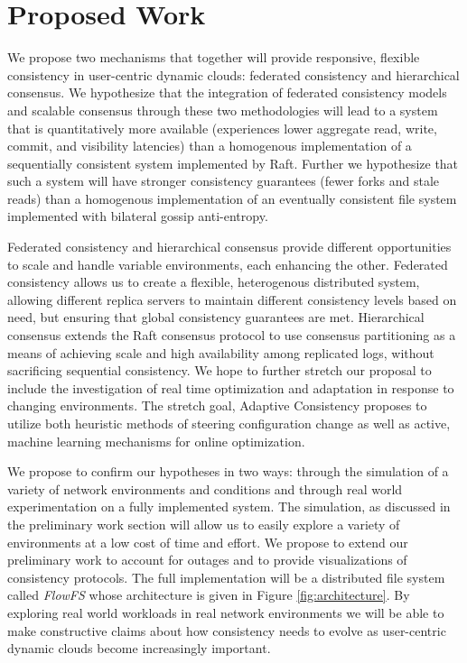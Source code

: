 \documentclass{article}
\begin{document}
\section{Proposed Work}
\label{sec:proposed_work}

We propose two mechanisms that together will provide responsive, flexible consistency in user-centric dynamic clouds: federated consistency and hierarchical consensus. We hypothesize that the integration of federated consistency models and scalable consensus through these two methodologies will lead to a system that is quantitatively more available (experiences lower aggregate read, write, commit, and visibility latencies) than a homogenous implementation of a sequentially consistent system implemented by Raft. Further we hypothesize that such a system will have stronger consistency guarantees (fewer forks and stale reads) than a homogenous implementation of an eventually consistent file system implemented with bilateral gossip anti-entropy.

Federated consistency and hierarchical consensus provide different opportunities to scale and handle variable environments, each enhancing the other. Federated consistency allows us to create a flexible, heterogenous distributed system, allowing different replica servers to maintain different consistency levels based on need, but ensuring that global consistency guarantees are met. Hierarchical consensus extends the Raft consensus protocol to use consensus partitioning as a means of achieving scale and high availability among replicated logs, without sacrificing sequential consistency. We hope to further stretch our proposal to include the investigation of real time optimization and adaptation in response to changing environments. The stretch goal, Adaptive Consistency proposes to utilize both heuristic methods of steering configuration change as well as active, machine learning mechanisms for online optimization.

We propose to confirm our hypotheses in two ways: through the simulation of a variety of network environments and conditions and through real world experimentation on a fully implemented system. The simulation, as discussed in the preliminary work section will allow us to easily explore a variety of environments at a low cost of time and effort. We propose to extend our preliminary work to account for outages and to provide visualizations of consistency protocols. The full implementation will be a distributed file system called \emph{FlowFS} whose architecture is given in Figure \ref{fig:architecture}. By exploring real world workloads in real network environments we will be able to make constructive claims about how consistency needs to evolve as user-centric dynamic clouds become increasingly important.
\end{document}
